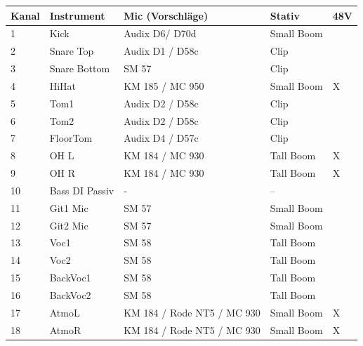 \documentclass{article}
\begin{document}
  \begin{tabular}{|l|l|l|l|l|}
  \hline
  \textbf{Kanal} & \textbf{Instrument} & \textbf{Mic (Vorschläge)} & \textbf{Stativ} & \textbf{48V}\\
  \hline
  1  & Kick           & Audix D6/ D70d             & Small Boom &   \\
  2  & Snare Top      & Audix D1 / D58c            & Clip       &   \\
  3  & Snare Bottom   & SM 57                      & Clip       &   \\
  4  & HiHat          & KM 185 / MC 950            & Small Boom & X \\
  5  & Tom1           & Audix D2 / D58c            & Clip       &   \\
  6  & Tom2           & Audix D2 / D58c            & Clip       &   \\
  7  & FloorTom       & Audix D4 / D57c            & Clip       &   \\
  8  & OH L           & KM 184 / MC 930            & Tall Boom  & X \\
  9  & OH R           & KM 184 / MC 930            & Tall Boom  & X \\
  10 & Bass DI Passiv & -                          & --         &   \\
  11 & Git1 Mic       & SM 57                      & Small Boom &   \\
  12 & Git2 Mic       & SM 57                      & Small Boom &   \\
  13 & Voc1           & SM 58                      & Tall Boom  &   \\
  14 & Voc2           & SM 58                      & Tall Boom  &   \\
  15 & BackVoc1       & SM 58                      & Tall Boom  &   \\
  16 & BackVoc2       & SM 58                      & Tall Boom  &   \\
  17 & AtmoL          & KM 184 / Rode NT5 / MC 930 & Small Boom & X \\
  18 & AtmoR          & KM 184 / Rode NT5 / MC 930 & Small Boom & X \\
  \hline
  \end{tabular}
\end{document}
